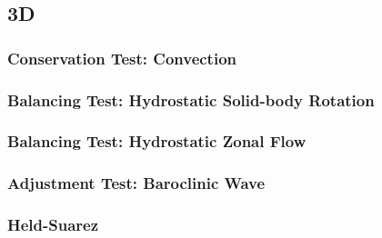 \documentclass{report}
\begin{document}
\subsection{3D}

\subsubsection{Conservation Test: Convection}
\subsubsection{Balancing Test: Hydrostatic Solid-body Rotation}
\subsubsection{Balancing Test: Hydrostatic Zonal Flow}
\subsubsection{Adjustment Test: Baroclinic Wave}
\subsubsection{Held-Suarez}



\end{document}
